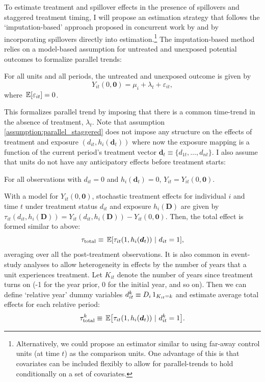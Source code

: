 To estimate treatment and spillover effects in the presence of spillovers and staggered treatment timing, I will propose an estimation strategy that follows the `imputation-based' approach proposed in concurrent work by \citet{Gardner_2021} and \citet{Borusyak_Jaravel_Spiess_2021} by incorporating spillovers directly into estimation.\footnote{Alternatively, we could propose an estimator similar to \citet{Callaway_SantAnna_2020} using far-away control units (at time $t$) as the comparison units. One advantage of this is that covariates can be included flexibly to allow for parallel-trends to hold conditionally on a set of covariates.} The imputation-based method relies on a model-based assumption for untreated and unexposed potential outcomes to formalize parallel trends:
\begin{assumption}\label{assumption:parallel_staggered}
  For all units and all periods, the untreated and unexposed outcome is given by
  \begin{equation}\label{eq:y0_staggered}
    Y_{it}(0, \bm{0}) = \mu_i + \lambda_t + \varepsilon_{it},
  \end{equation}
  where $\expec{\varepsilon_{it}} = 0$.
\end{assumption}
This formalizes parallel trend by imposing that there is a common time-trend in the absence of treatment, $\lambda_t$. Note that assumption \ref{assumption:parallel_staggered} does not impose any structure on the effects of treatment and exposure $(d_{it}, h_i(\bm{d}_t))$ where now the exposure mapping is a function of the current period's treatment vector $\bm{d}_t \equiv \{d_{1t}, \dots, d_{nt} \}$. I also assume that units do not have any anticipatory effects before treatment starts:
\begin{assumption}\label{assumption:no-anticipation_staggered}
  For all observations with $d_{it} = 0$ and $h_i(\bm{d}_t) = 0$, $Y_{it} = Y_{it}(0, \bm{0})$.
\end{assumption}

With a model for $Y_{it}(0, \bm{0})$, stochastic treatment effects for individual $i$ and time $t$ under treatment status $d_{it}$ and exposure $h_i(\bm{D})$ are given by $\tau_{it}(d_{it}, h_i(\bm{D})) = Y_{it}(d_{it}, h_i(\bm{D})) - Y_{it}(0, \bm{0})$. Then, the total effect is formed similar to above:
\[
  \tau_{\text{total}} \equiv \expec{ \tau_{it}(1, h_i(\bm{d}_t)) \ \vert \ d_{it} = 1},
\]
averaging over all the post-treatment observations. It is also common in event-study analyses to allow heterogeneity in effects by the number of years that a unit experiences treatment. Let $K_{it}$ denote the number of years since treatment turns on (-1 for the year prior, 0 for the initial year, and so on). Then we can define `relative year' dummy variables $d_{it}^k \equiv D_{i} \one_{K_{it} = k}$ and estimate average total effects for each relative period: 
\[
  \tau_{\text{total}}^k \equiv \expec{ \tau_{it}(1, h_i(\bm{d}_t)) \ \vert \ d_{it}^k = 1}.
\]

